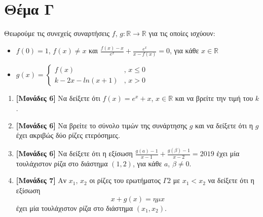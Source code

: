 \documentclass[12pt]{article}
\begin{document}
    \section*{Θέμα Γ}
      \noindent
      Θεωρούμε τις συνεχείς συναρτήσεις $f$, $g:\mathbb{R}\to \mathbb{R}$ για τις οποίες ισχύουν:
      \begin{itemize}
        \item $f(0)=1$, $f(x)\ne x$ και $\frac{f(x)-x}{e^x}+\frac{e^x}{x-f(x)}=0$, για κάθε $x\in \mathbb{R}$
        \item $g(x)=\begin{cases} f(x) & \text{, }  x\le 0 \\ k-2x-ln(x+1) & \text{, }  x>0\end{cases}$
      \end{itemize}

      \begin{enumerate}
        \item \textbf{[Μονάδες 6]} Να δείξετε ότι $f(x)=e^x+x$, $x\in \mathbb{R}$ και να βρείτε την τιμή του $k$.
        \item \textbf{[Μονάδες 6]} Να βρείτε το σύνολο τιμών της συνάρτησης $g$ και να δείξετε ότι η $g$ έχει ακριβώς δύο ρίζες ετερόσημες.
        \item \textbf{[Μονάδες 6]} Να δείξετε ότι η εξίσωση $\frac{g(a)-1}{x-1}+\frac{g(β)-1}{x-2}=2019$ έχει μία τουλάχιστον ρίζα στο διάστημα $(1,2)$, για κάθε $a$, $β\ne 0$.
        \item \textbf{[Μονάδες 7]} Αν $x_1$, $x_2$ οι ρίζες του ερωτήματος $Γ2$ με $x_1 < x_2$ να δείξετε ότι η εξίσωση
        $$x+g(x)=ημ x$$
        έχει μία τουλάχιστον ρίζα στο διάστημα $(x_1,x_2)$.
      \end{enumerate}
\end{document}
